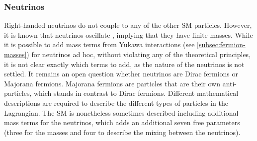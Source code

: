 \subsubsection{Neutrinos}
Right-handed neutrinos do not couple to any of the other SM particles.
However, it is known that neutrinos oscillate \cite{Gonzalez_Garcia_2008}, implying that they have finite masses.
While it is possible to add mass terms from Yukawa interactions (see \cref{subsec:fermion-masses}) for neutrinos ad hoc, without violating any of the theoretical principles, it is not clear exactly which terms to add, as the nature of the neutrinos is not settled. It remains an open question whether neutrinos are Dirac fermions or Majorana fermions. Majorana fermions are particles that are their own anti-particles, which stands in contrast to Dirac fermions. Different mathematical descriptions are required to describe the different types of particles in the Lagrangian. 
The SM is nonetheless sometimes described including additional mass terms for the neutrinos, which adds an additional seven free parameters (three for the masses and four to describe the mixing between the neutrinos).



